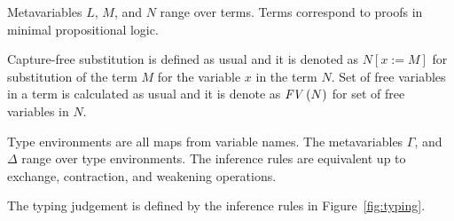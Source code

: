 \documentclass[a4paper]{article}
\newcommand{\sbs}[3]{#1[#2:=#3]}
\newcommand{\fv}[1]{\txt{FV}\,(#1)}
\newcommand{\txt}[1]{\text{\textit{#1}}}
\begin{document}
Metavariables $L$, $M$, and $N$ range over terms. Terms
correspond to proofs in minimal propositional logic.


Capture-free substitution is defined as usual and it is denoted as
$\sbs{N}{x}{M}$ for substitution of the term $M$ for the variable
$x$ in the term $N$. Set of free variables in a term is
calculated as usual and it is denote as $\fv{N}$ for set of free
variables in $N$. 

Type %
 environments are all maps from
variable names. The metavariables $\Gamma$, and $\Delta$ range over
type environments.  The inference rules are equivalent up to exchange,
contraction, and weakening operations. 

The typing judgement is defined by the inference rules in
Figure~\ref{fig:typing}.
\end{document}
